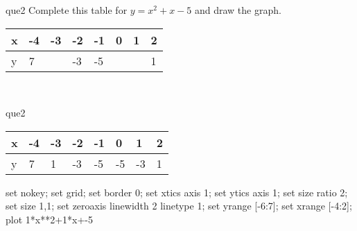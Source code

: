 \documentclass[13.5pt, varwidth=true]{beamer}
\begin{document}
\begin{frame}[shrink=19,fragile]
	\begin{beamercolorbox}[rounded=true, left, shadow=true,wd=14.8cm]{que2}
		 Complete this table for $y = x^{2} + x - 5$ and draw the graph. \\[0.3cm] \renewcommand{\arraystretch}{1.2}\begin{tabular}{|C|C|C|C|C|C|C|C|} \hline x & -4 & -3 & -2 & -1 & 0 & 1 & 2 \\ \hline y & 7 &  & -3 & -5 &  &  & 1\\ \hline \end{tabular}\\[0.3cm]
	\end{beamercolorbox}
\end{frame}
\begin{frame}[shrink=19,fragile]
	\begin{beamercolorbox}[rounded=true, left, shadow=true,wd=14.8cm]{que2}
		\renewcommand{\arraystretch}{1.2}\begin{tabular}{|C|C|C|C|C|C|C|C|} \hline x & -4 & -3 & -2 & -1 & 0 & 1 & 2 \\ \hline y & 7 & 1 & -3 & -5 & -5 & -3 & 1\\ \hline \end{tabular}\begin{gnuplot}[terminal=pdf] set nokey; set grid; set border 0; set xtics axis 1; set ytics axis 1; set size ratio 2; set size 1,1; set zeroaxis linewidth 2 linetype 1; set yrange [-6:7]; set xrange [-4:2]; plot 1*x**2+1*x+-5 \end{gnuplot}
	\end{beamercolorbox}
\end{frame}
\end{document}
